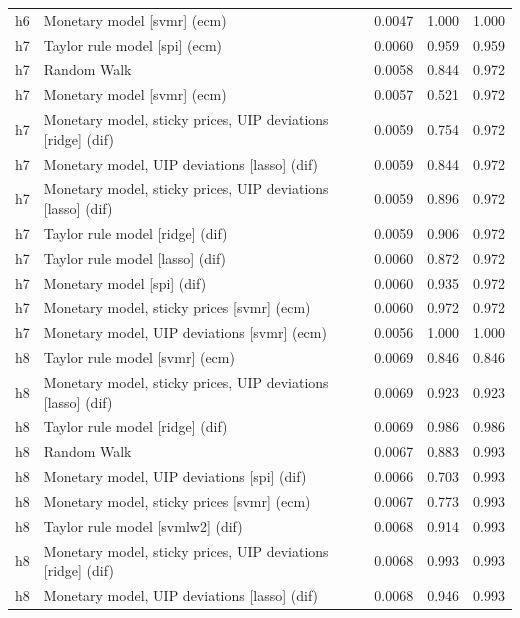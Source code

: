 \begin{ThreePartTable}
\begin{longtable}[t]{cp{5.5cm}ccc}
h6 & \raggedright Monetary model [svmr] (ecm) & 0.0047 & 1.000 & 1.000\\
\addlinespace
h7 & \raggedright Taylor rule model [spi] (ecm) & 0.0060 & 0.959 & 0.959\\
h7 & \raggedright Random Walk & 0.0058 & 0.844 & 0.972\\
h7 & \raggedright Monetary model [svmr] (ecm) & 0.0057 & 0.521 & 0.972\\
h7 & \raggedright Monetary model, sticky prices, UIP deviations [ridge] (dif) & 0.0059 & 0.754 & 0.972\\
h7 & \raggedright Monetary model, UIP deviations [lasso] (dif) & 0.0059 & 0.844 & 0.972\\
h7 & \raggedright Monetary model, sticky prices, UIP deviations [lasso] (dif) & 0.0059 & 0.896 & 0.972\\
h7 & \raggedright Taylor rule model [ridge] (dif) & 0.0059 & 0.906 & 0.972\\
h7 & \raggedright Taylor rule model [lasso] (dif) & 0.0060 & 0.872 & 0.972\\
h7 & \raggedright Monetary model [spi] (dif) & 0.0060 & 0.935 & 0.972\\
h7 & \raggedright Monetary model, sticky prices [svmr] (ecm) & 0.0060 & 0.972 & 0.972\\
h7 & \raggedright Monetary model, UIP deviations [svmr] (ecm) & 0.0056 & 1.000 & 1.000\\
\addlinespace
h8 & \raggedright Taylor rule model [svmr] (ecm) & 0.0069 & 0.846 & 0.846\\
h8 & \raggedright Monetary model, sticky prices, UIP deviations [lasso] (dif) & 0.0069 & 0.923 & 0.923\\
h8 & \raggedright Taylor rule model [ridge] (dif) & 0.0069 & 0.986 & 0.986\\
h8 & \raggedright Random Walk & 0.0067 & 0.883 & 0.993\\
h8 & \raggedright Monetary model, UIP deviations [spi] (dif) & 0.0066 & 0.703 & 0.993\\
h8 & \raggedright Monetary model, sticky prices [svmr] (ecm) & 0.0067 & 0.773 & 0.993\\
h8 & \raggedright Taylor rule model [svmlw2] (dif) & 0.0068 & 0.914 & 0.993\\
h8 & \raggedright Monetary model, sticky prices, UIP deviations [ridge] (dif) & 0.0068 & 0.993 & 0.993\\
h8 & \raggedright Monetary model, UIP deviations [lasso] (dif) & 0.0068 & 0.946 & 0.993\\

\end{longtable}
\end{ThreePartTable}

